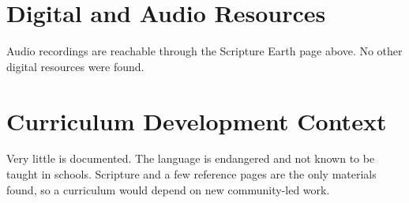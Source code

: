 \documentclass[12pt]{article}
\begin{document}
\section{Digital and Audio Resources}
Audio recordings are reachable through the Scripture Earth page above. No other digital resources were found.

\section{Curriculum Development Context}
Very little is documented. The language is endangered and not known to be taught in schools. Scripture and a few reference pages are the only materials found, so a curriculum would depend on new community-led work.
\end{document}
